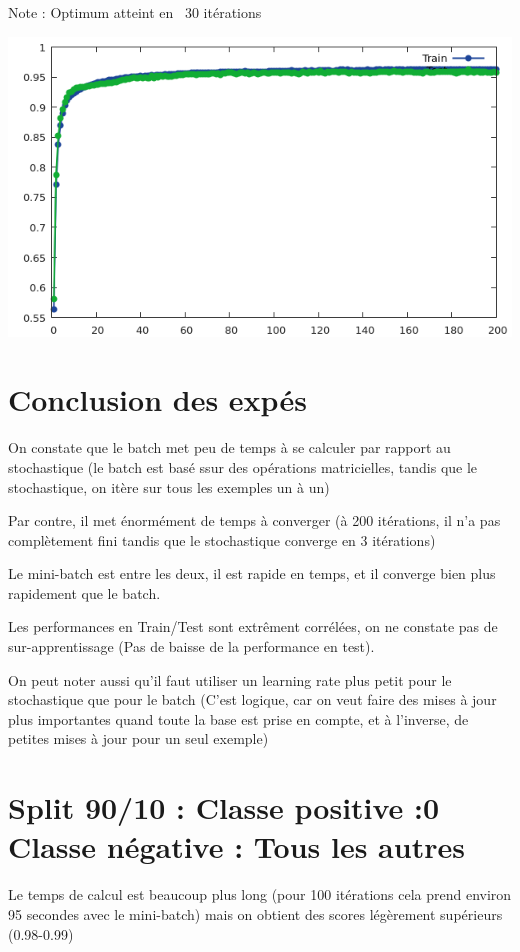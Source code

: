 \documentclass[a4paper]{article}
\begin{document}
Note : Optimum atteint en ~30 itérations

\includegraphics[scale=0.55]{Minibatch100.png}

\section{Conclusion des expés}

On constate que le batch met peu de temps à se calculer par rapport au stochastique (le batch est basé ssur des opérations matricielles, tandis que le stochastique, on itère sur tous les exemples un à un)

Par contre, il met énormément de temps à converger (à 200 itérations, il n'a pas complètement fini tandis que le stochastique converge en 3 itérations)

Le mini-batch est entre les deux, il est rapide en temps, et il converge bien plus rapidement que le batch.

Les performances en Train/Test sont extrêment corrélées, on ne constate pas de sur-apprentissage (Pas de baisse de la performance en test).


On peut noter aussi qu'il faut utiliser un learning rate plus petit pour le stochastique que pour le batch (C'est logique, car on veut faire des mises à jour plus importantes quand toute la base est prise en compte, et à l'inverse, de petites mises à jour pour un seul exemple)

\section{Split 90/10 : Classe positive :0 \newline Classe négative : Tous les autres}

Le temps de calcul est beaucoup plus long (pour 100 itérations cela prend environ 95 secondes avec le mini-batch) mais on obtient des scores légèrement supérieurs (0.98-0.99)
\end{document}
